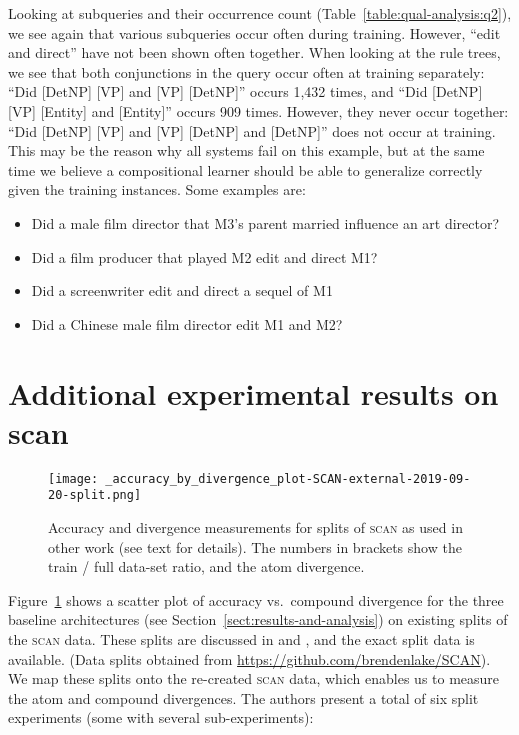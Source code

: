 \documentclass[letterpaper]{article}
\newcommand{\SCAN}{\textsc{scan}}
\begin{document}
Looking at subqueries and their occurrence count (Table~\ref{table:qual-analysis:q2}), we see again that various subqueries occur often during training. However, ``edit and direct'' have not been shown often together. When looking at the rule trees, we see that both conjunctions in the query occur often at training separately: ``Did [DetNP] [VP] and [VP] [DetNP]'' occurs 1,432 times, and ``Did [DetNP] [VP] [Entity] and [Entity]'' occurs 909 times. However, they never occur together: ``Did [DetNP] [VP] and [VP] [DetNP] and [DetNP]'' does not occur at training. This may be the reason why all systems fail on this example, but at the same time we believe a compositional learner should be able to generalize correctly given the training instances. Some examples are:
\begin{itemize}
    \item Did a male film director that M3's parent married influence an art director?
    \item Did a film producer that played M2 edit and direct M1?
    \item Did a screenwriter edit and direct a sequel of M1
    \item Did a Chinese male film director edit M1 and M2?
\end{itemize}


\section{Additional experimental results on scan}
\label{suppl:scan}
\vspace{1ex}

\begin{figure}[tb]
    \centering
    \texttt{[image: \_accuracy\_by\_divergence\_plot-SCAN-external-2019-09-20-split.png]}
\caption{Accuracy and divergence measurements for splits of \SCAN{} as used in other work (see text for details).  The numbers in brackets show the train / full data-set ratio, and the atom divergence.}
    \label{fig:scan}
\end{figure}

Figure~\ref{fig:scan} shows a scatter plot of accuracy vs.\ compound divergence for the three baseline architectures (see Section~\ref{sect:results-and-analysis}) on existing splits of the \SCAN{} data. These splits are discussed in \citep{Lake2018GeneralizationWS} and \citep{rearranging}, and the exact split data is available. (Data splits obtained from \url{https://github.com/brendenlake/SCAN}). We map these splits onto the re-created \SCAN{} data, which enables us to measure the atom and compound divergences.  
The authors present a total of six split experiments (some with several sub-experiments):
\vspace{1ex}
\end{document}
